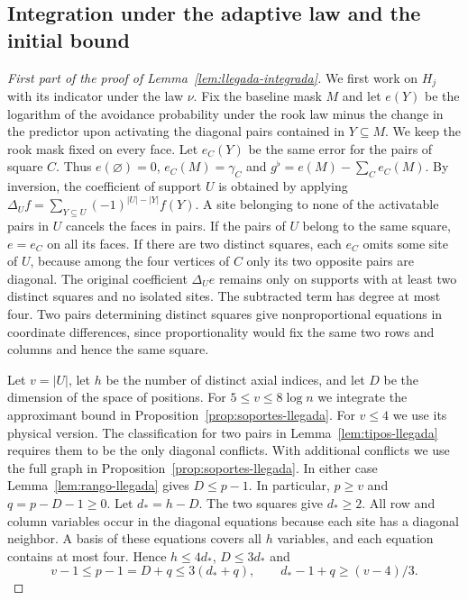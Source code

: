 \subsection{Integration under the adaptive law and the initial bound}
\begin{proof}[First part of the proof of Lemma~\ref{lem:llegada-integrada}]
We first work on \(H_j\) with its indicator under the law \(\nu\). Fix the baseline mask \(M\) and let
\(e(Y)\) be the logarithm of the avoidance probability under the rook law minus the change in the
predictor upon activating the diagonal pairs contained in \(Y\subseteq M\). We keep the rook mask fixed
on every face. Let \(e_C(Y)\) be the same error for the pairs of square \(C\). Thus \(e(\varnothing)=0\),
\(e_C(M)=\gamma_C\) and \(g^\flat=e(M)-\sum_C e_C(M)\). By inversion, the coefficient of support \(U\) is
obtained by applying \(\Delta_U f=\sum_{Y\subseteq U}(-1)^{|U|-|Y|}f(Y)\). A site belonging to none of
the activatable pairs in \(U\) cancels the faces in pairs. If the pairs of \(U\) belong to the same
square, \(e=e_C\) on all its faces. If there are two distinct squares, each \(e_C\) omits some site of
\(U\), because among the four vertices of \(C\) only its two opposite pairs are diagonal. The original
coefficient \(\Delta_U e\) remains only on supports with at least two distinct squares and no isolated
sites. The subtracted term has degree at most four. Two pairs determining distinct squares give
nonproportional equations in coordinate differences, since proportionality would fix the same two rows
and columns and hence the same square.

Let \(v=|U|\), let \(h\) be the number of distinct axial indices, and let \(D\) be the dimension of the
space of positions. For \(5\le v\le8\log n\) we integrate the approximant bound in
Proposition~\ref{prop:soportes-llegada}. For \(v\le4\) we use its physical version. The classification
for two pairs in Lemma~\ref{lem:tipos-llegada} requires them to be the only diagonal conflicts. With
additional conflicts we use the full graph in Proposition~\ref{prop:soportes-llegada}. In either case
Lemma~\ref{lem:rango-llegada} gives \(D\le p-1\). In particular, \(p\ge v\) and \(q=p-D-1\ge0\). Let
\(d_*=h-D\). The two squares give \(d_*\ge2\). All row and column variables occur in the diagonal
equations because each site has a diagonal neighbor. A basis of these equations covers all \(h\)
variables, and each equation contains at most four. Hence \(h\le4d_*\), \(D\le3d_*\) and
\[
 v-1\le p-1=D+q\le3(d_*+q),\qquad d_*-1+q\ge(v-4)/3 .
\]


\end{proof}
